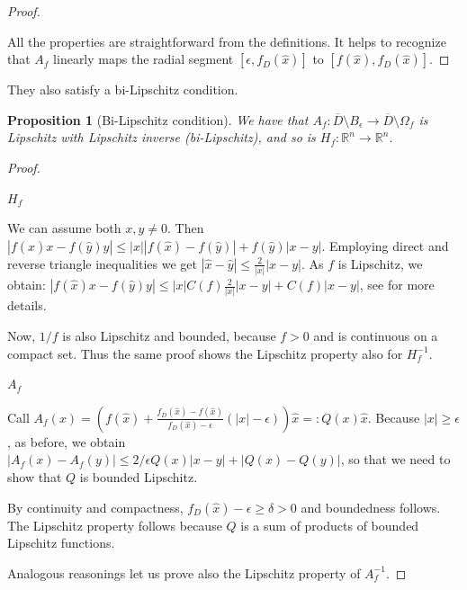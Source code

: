 \documentclass[english,a4paper,10pt,oneside]{scrbook}	%
\theoremstyle{break}
\newtheorem{prop}[equation]{Proposition}
\newenvironment{mproof}[1][\proofname]{%
  \begin{proof}[#1]$ $\par\nobreak\ignorespaces
}{%
  \end{proof}
}
\renewcommand*{\proofname}{Proof}
\theoremstyle{remark}
\newcommand{\mR}{\mathbb{R}}
\newcommand{\xh}{\hat{x}}
\newcommand{\yh}{\hat{y}}
\newcommand{\eps}{\epsilon}
\begin{document}
\begin{mproof}
All the properties are straightforward from the definitions. It helps to recognize that $A_f$ linearly maps the radial segment $[\eps, f_D(\xh)]$ to $[f(\xh), f_D(\xh)]$.
\end{mproof}


They also satisfy a bi-Lipschitz condition.

\begin{prop}[Bi-Lipschitz condition]
We have that $A_f:  \overline{D}\setminus B_\eps\rightarrow \overline{D}\setminus \Omega_f $ is Lipschitz with Lipschitz inverse (bi-Lipschitz), and so is $H_f: \mR^n \rightarrow \mR^n$.
\end{prop}

\begin{mproof}


\underline{$H_f$}

We can assume both $x,y\neq 0$. Then $|f(\xh)x-f(\yh)y|\leq |x||f(\xh)-f(\yh)|+f(\yh)|x-y|$. Employing direct and reverse triangle inequalities we get $|\xh-\yh|\leq \frac{2}{|x|}|x-y|$.
As $f$ is Lipschitz, we obtain:  $|f(\xh)x-f(\yh)y|\leq |x|C(f)\frac{2}{|x|}|x-y|+C(f)|x-y|$, see \cite{deckelnick} for more details.

Now, $1/f$ is also Lipschitz and bounded, because $f>0$ and is continuous on a compact set. Thus the same proof shows the Lipschitz property also for $H_f^{-1}$.

\underline{$A_f$}

Call $A_f(x)=\left (  f(\xh)+\frac{f_D(\xh)-f(\xh)}{f_D(\xh)-\eps}(|x|-\eps) \right )\xh =:Q(x)\xh $. Because $|x|\geq\eps$, as before, we obtain $|A_f(x)-A_f(y)|\leq 2/\eps Q(x) |x-y|+|Q(x)-Q(y)|$, so that we need to show that $Q$ is bounded Lipschitz.

By continuity and compactness, $f_D(\xh)-\eps\geq \delta >0$ and boundedness follows. The Lipschitz property follows because $Q$ is a sum of products of bounded Lipschitz functions.

Analogous reasonings let us prove also the Lipschitz property of $A_f^{-1}$.
\end{mproof}
\end{document}
